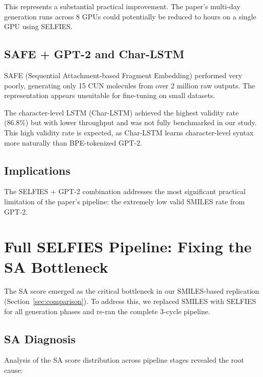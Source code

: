 \documentclass[11pt,a4paper]{article}
\begin{document}
This represents a substantial practical improvement. The paper's multi-day generation runs across 8 GPUs could potentially be reduced to hours on a single GPU using SELFIES.

\subsection{SAFE + GPT-2 and Char-LSTM}

SAFE (Sequential Attachment-based Fragment Embedding) performed very poorly, generating only 15 CUN molecules from over 2 million raw outputs. The representation appears unsuitable for fine-tuning on small datasets.

The character-level LSTM (Char-LSTM) achieved the highest validity rate (86.8\%) but with lower throughput and was not fully benchmarked in our study. This high validity rate is expected, as Char-LSTM learns character-level syntax more naturally than BPE-tokenized GPT-2.

\subsection{Implications}

The SELFIES + GPT-2 combination addresses the most significant practical limitation of the paper's pipeline: the extremely low valid SMILES rate from GPT-2.

\section{Full SELFIES Pipeline: Fixing the SA Bottleneck}
\label{sec:selfies_pipeline}

The SA score emerged as the critical bottleneck in our SMILES-based replication (Section~\ref{sec:comparison}). To address this, we replaced SMILES with SELFIES for all generation phases and re-ran the complete 3-cycle pipeline.

\subsection{SA Diagnosis}

Analysis of the SA score distribution across pipeline stages revealed the root cause:
\end{document}
